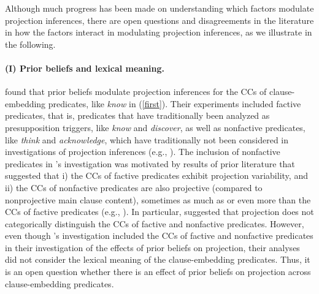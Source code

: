 \documentclass[11pt,fleqn]{article}
\newcommand{\6}{\mbox{$[\hspace*{-.6mm}[$}}
\newcommand{\9}{\mbox{$]\hspace*{-.6mm}]$}}
\newcommand{\citepos}[1]{\citeauthor{#1}'s \citeyear{#1}}
\begin{document}
Although much progress has been made on understanding which factors modulate projection inferences, there are open questions and disagreements in the literature in how the factors interact in modulating projection inferences, as we illustrate in the following.

\paragraph{(I) Prior beliefs and lexical meaning.} \citealt{degen-tonhauser-openmind} found that prior beliefs modulate projection inferences for the CCs of clause-embedding predicates, like {\em know} in (\ref{first}). Their experiments included factive predicates, that is, predicates that have traditionally been analyzed as presupposition triggers, like {\em know} and {\em discover}, as well as nonfactive predicates, like {\em think} and {\em acknowledge}, which have traditionally not been considered in investigations of projection inferences (e.g., \citealt{kiparsky-kiparsky70}). The inclusion of nonfactive predicates in \citepos{degen-tonhauser-openmind} investigation was motivated by results of prior literature that suggested that i) the CCs of factive predicates exhibit projection variability, and ii) the CCs of nonfactive predicates are also projective (compared to nonprojective main clause content), sometimes as much as or even more than the CCs of factive predicates (e.g., \citealt{demarneffe-etal-sub23,tbd-variability,degen-tonhauser-language}). In particular, \citealt{degen-tonhauser-language} suggested that projection does not categorically distinguish the CCs of factive and nonfactive predicates. However, even though \citepos{degen-tonhauser-openmind} investigation included the CCs of factive and nonfactive predicates in their investigation of the effects of prior beliefs on projection, their analyses did not consider the lexical meaning of the clause-embedding predicates. Thus, it is an open question whether there is an effect of prior beliefs on projection across clause-embedding predicates. 
\end{document}
